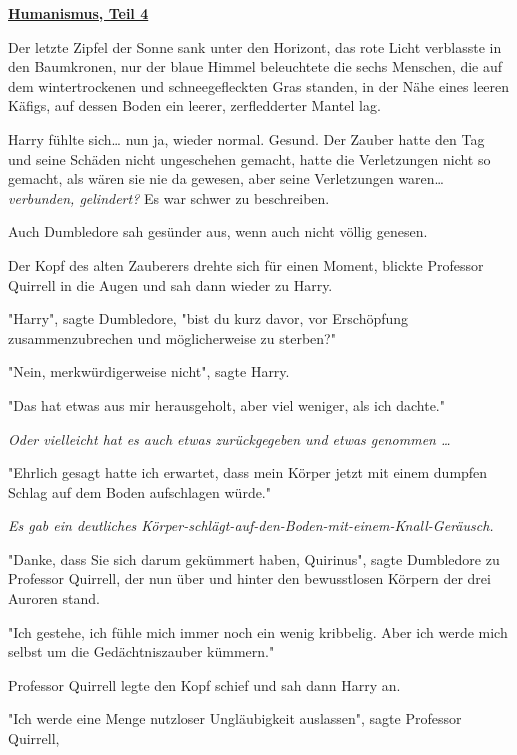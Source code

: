 

\hypertarget{humanismus-teil-4}{%

\textbf{\uline{Humanismus, Teil 4}}

Der letzte Zipfel der Sonne sank unter den Horizont, das rote Licht verblasste in den Baumkronen, nur der blaue Himmel beleuchtete die sechs Menschen, die auf dem wintertrockenen und schneegefleckten Gras standen, in der Nähe eines leeren Käfigs, auf dessen Boden ein leerer, zerfledderter Mantel lag.

Harry fühlte sich… nun ja, wieder normal. Gesund. Der Zauber hatte den Tag und seine Schäden nicht ungeschehen gemacht, hatte die Verletzungen nicht so gemacht, als wären sie nie da gewesen, aber seine Verletzungen waren… \emph{verbunden, gelindert?} Es war schwer zu beschreiben.

Auch Dumbledore sah gesünder aus, wenn auch nicht völlig genesen.

Der Kopf des alten Zauberers drehte sich für einen Moment, blickte Professor Quirrell in die Augen und sah dann wieder zu Harry.

"Harry", sagte Dumbledore, "bist du kurz davor, vor Erschöpfung zusammenzubrechen und möglicherweise zu sterben?"

"Nein, merkwürdigerweise nicht", sagte Harry.

"Das hat etwas aus mir herausgeholt, aber viel weniger, als ich dachte."

\emph{Oder vielleicht hat es auch etwas zurückgegeben und etwas genommen …}

"Ehrlich gesagt hatte ich erwartet, dass mein Körper jetzt mit einem dumpfen Schlag auf dem Boden aufschlagen würde."

\emph{Es gab ein deutliches Körper-schlägt-auf-den-Boden-mit-einem-Knall-Geräusch.}

"Danke, dass Sie sich darum gekümmert haben, Quirinus", sagte Dumbledore zu Professor Quirrell, der nun über und hinter den bewusstlosen Körpern der drei Auroren stand.

"Ich gestehe, ich fühle mich immer noch ein wenig kribbelig. Aber ich werde mich selbst um die Gedächtniszauber kümmern."

Professor Quirrell legte den Kopf schief und sah dann Harry an.

"Ich werde eine Menge nutzloser Ungläubigkeit auslassen", sagte Professor Quirrell,

}
